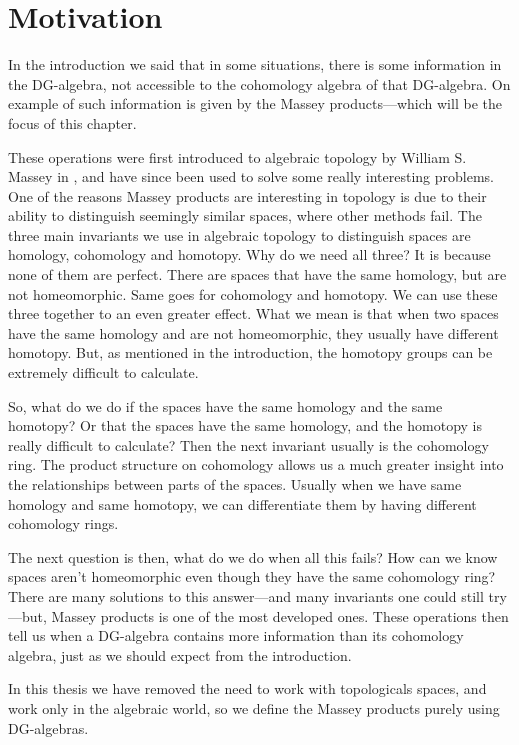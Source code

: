 
\section{Motivation}

In the introduction we said that in some situations, there is some information in the DG-algebra, not accessible to the cohomology algebra of that DG-algebra. On example of such information is given by the Massey products---which will be the focus of this chapter. 

These operations were first introduced to algebraic topology by William S. Massey in \cite{massey}, and have since been used to solve some really interesting problems. One of the reasons Massey products are interesting in topology is due to their ability to distinguish seemingly similar spaces, where other methods fail. The three main invariants we use in algebraic topology to distinguish spaces are homology, cohomology and homotopy. Why do we need all three? It is because none of them are perfect. There are spaces that have the same homology, but are not homeomorphic. Same goes for cohomology and homotopy. We can use these three together to an even greater effect. What we mean is that when two spaces have the same homology and are not homeomorphic, they usually have different homotopy. But, as mentioned in the introduction, the homotopy groups can be extremely difficult to calculate. 

So, what do we do if the spaces have the same homology and the same homotopy? Or that the spaces have the same homology, and the homotopy is really difficult to calculate? Then the next invariant usually is the cohomology ring. The product structure on cohomology allows us a much greater insight into the relationships between parts of the spaces. Usually when we have same homology and same homotopy, we can differentiate them by having different cohomology rings. 

The next question is then, what do we do when all this fails? How can we know spaces aren't homeomorphic even though they have the same cohomology ring? There are many solutions to this answer---and many invariants one could still try---but, Massey products is one of the most developed ones. These operations then tell us when a DG-algebra contains more information than its cohomology algebra, just as we should expect from the introduction. 

In this thesis we have removed the need to work with topologicals spaces, and work only in the algebraic world, so we define the Massey products purely using DG-algebras.  

